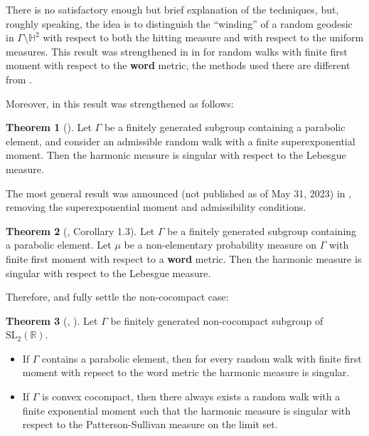 \documentclass[11pt]{amsart}
\theoremstyle{definition}
\newtheorem{theorem}{Theorem}[section]
\begin{document}
	There is no satisfactory enough but brief explanation of the techniques, but, roughly speaking, the idea is to distinguish the ``winding'' of a random geodesic in $\Gamma \setminus \mathbb{H}^2$ with respect to both the hitting measure and with respect to the uniform measures. This result was strengthened in \cite{MR2568439} in 
	\cite{Gadre2015WordLS} for random walks with finite first moment with respect to the \textbf{word} metric, the methods used there are different from \cite{guivarch1990}.
	
	Moreover, in \cite{MR4069238} this result was strengthened as follows:
	
	\begin{theorem}[\cite{MR4069238}]
		Let $\Gamma$ be a finitely generated subgroup containing a parabolic element, and consider an admissible random walk with a finite superexponential moment. Then the harmonic measure is singular with respect to the Lebesgue measure.
	\end{theorem}
	
	The most general result was announced (not published as of May 31, 2023) in \cite{benard2023winding}, removing the superexponential moment and admissibility conditions. 
	
	\begin{theorem}[\cite{benard2023winding}, Corollary 1.3]
		Let $\Gamma$ be a finitely generated subgroup containing a parabolic element. Let $\mu$ be a non-elementary probability measure on $\Gamma$ with finite first moment with respect to a \textbf{word} metric. Then the harmonic measure is singular with respect to the Lebesgue measure.
	\end{theorem}
	
	Therefore, \cite{benard2023winding} and \cite{linaudpan} fully settle the non-cocompact case:
	
	\begin{theorem}[\cite{benard2023winding}, \cite{linaudpan}]
		Let $\Gamma$ be finitely generated non-cocompact subgroup of $\text{SL}_2(\mathbb{R})$.
		\begin{itemize}
			\item If $\Gamma$ contains a parabolic element, then for every random walk with finite first moment with repsect to the word metric the harmonic measure is singular.
			\item If $\Gamma$ is convex cocompact, then there always exists a random walk with a finite exponential moment such that the harmonic measure is singular with respect to the Patterson-Sullivan measure on the limit set.
		\end{itemize}
	\end{theorem}
	
\end{document}
